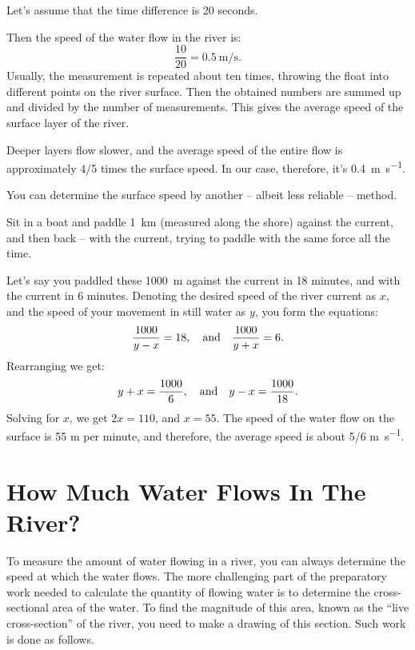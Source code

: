 Let's assume that the time difference is 20 seconds.

Then the speed of the water flow in the river is:
\begin{equation*}%
\frac{10}{20} = \SI{0.5}{\meter\per\second}.
\end{equation*}
Usually, the measurement is repeated about ten times, throwing the float into different points on the river surface. Then the obtained numbers are summed up and divided by the number of measurements. This gives the average speed of the surface layer of the river.

Deeper layers flow slower, and the average speed of the entire flow is approximately 4/5 times the surface speed. In our case, therefore, it's \SI{0.4}{\meter\per\second}.

You can determine the surface speed by another -- albeit less reliable -- method.

Sit in a boat and paddle \SI{1}{\kilo\meter} (measured along the shore) against the current, and then back -- with the current, trying to paddle with the same force all the time.

Let's say you paddled these \SI{1000}{\meter} against the current in 18 minutes, and with the current in 6 minutes. Denoting the desired speed of the river current as $x$, and the speed of your movement in still water as $y$, you form the equations:
\begin{equation*}%
\frac{1000}{y - x} = 18, \qand \frac{1000}{y + x} = 6.
\end{equation*}
Rearranging we get:
\begin{equation*}%
y + x = \frac{1000}{6}, \qand y - x = \frac{1000}{18}.
\end{equation*}
Solving for $x$, we get $2x = 110$, and $x = 55$. The speed of the water flow on the surface is 55 m per minute, and therefore, the average speed is about 5/6 \si{\meter\per\second}.


\section{How Much Water Flows In The River?}
\label{sec-2.08}

To measure the amount of water flowing in a river, you can always determine the speed at which the water flows. The more challenging part of the preparatory work needed to calculate the quantity of flowing water is to determine the cross-sectional area of the water. To find the magnitude of this area, known as the ``live cross-section'' of the river, you need to make a drawing of this section. Such work is done as follows.

